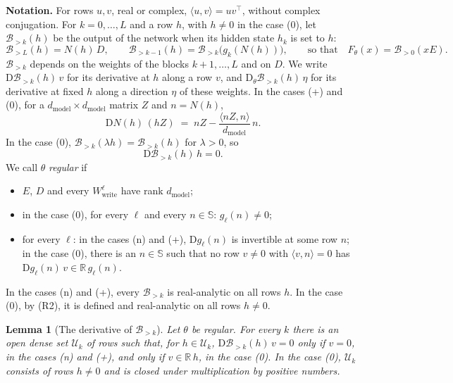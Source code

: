 \documentclass[10pt]{article}
\newtheorem{lemma}[theorem]{Lemma}
\theoremstyle{definition}
\theoremstyle{remark}
\newcommand{\R}{\mathbb{R}}
\newcommand{\Wwrite}{W_{\mathrm{write}}}
\newcommand{\dm}{d_{\mathrm{model}}}
\newcommand{\Der}{\mathrm{D}}
\newcommand{\para}[1]{\smallskip\noindent\textbf{#1}\hspace{0.5em}}
\begin{document}
\para{Notation.} For rows $u, v$, real or complex, $\langle u, v\rangle = uv^\top$, without complex conjugation. For $k = 0, \dots, L$ and a row $h$, with $h \neq 0$ in the case (0), let $\mathcal B_{>k}(h)$ be the output of the network when its hidden state $h_k$ is set to $h$:
\[
\mathcal B_{>L}(h) = N(h)\,D, \qquad \mathcal B_{>k-1}(h) = \mathcal B_{>k}\big(g_k(N(h))\big), \qquad\text{so that}\quad F_\theta(x) = \mathcal B_{>0}(xE).
\]
$\mathcal B_{>k}$ depends on the weights of the blocks $k+1, \dots, L$ and on $D$. We write $\Der\mathcal B_{>k}(h)\,v$ for its derivative at $h$ along a row $v$, and $\Der_\theta\mathcal B_{>k}(h)\,\eta$ for its derivative at fixed $h$ along a direction $\eta$ of these weights. In the cases (+) and (0), for a $\dm\times\dm$ matrix $Z$ and $n = N(h)$,
\begin{equation}\label{eq:sbDN}
\Der N(h)\,(hZ) \;=\; nZ - \frac{\langle nZ, n\rangle}{\dm}\,n .
\end{equation}
In the case (0), $\mathcal B_{>k}(\lambda h) = \mathcal B_{>k}(h)$ for $\lambda > 0$, so
\begin{equation}\label{eq:e0radial}
\Der\mathcal B_{>k}(h)\,h = 0 .
\end{equation}
We call $\theta$ \emph{regular} if
\begin{itemize}[leftmargin=2.9em]
\item[(R1)] $E$, $D$ and every $\Wwrite^{\ell}$ have rank $\dm$;
\item[(R2)] in the case (0), for every $\ell$ and every $n \in \mathbb S$: $g_\ell(n) \neq 0$;
\item[(R3)] for every $\ell$: in the cases (n) and (+), $\Der g_\ell(n)$ is invertible at some row $n$; in the case (0), there is an $n \in \mathbb S$ such that no row $v \neq 0$ with $\langle v, n\rangle = 0$ has $\Der g_\ell(n)\,v \in \R\,g_\ell(n)$.
\end{itemize}
In the cases (n) and (+), every $\mathcal B_{>k}$ is real-analytic on all rows $h$. In the case (0), by (R2), it is defined and real-analytic on all rows $h \neq 0$.

\begin{lemma}[The derivative of $\mathcal B_{>k}$]\label{lem:e0tailrank}
Let $\theta$ be regular. For every $k$ there is an open dense set $\mathcal U_k$ of rows such that, for $h \in \mathcal U_k$, $\Der\mathcal B_{>k}(h)\,v = 0$ only if $v = 0$, in the cases (n) and (+), and only if $v \in \R\,h$, in the case (0). In the case (0), $\mathcal U_k$ consists of rows $h \neq 0$ and is closed under multiplication by positive numbers.
\end{lemma}
\end{document}

